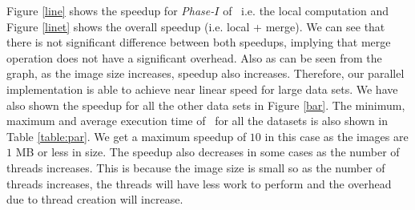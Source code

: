 Figure \ref{line} shows the speedup for {\em Phase-$I$} of \paremsp\ i.e. 
the local computation and Figure \ref{linet} shows the overall speedup (i.e.
local + merge). We can see that there is not significant difference between both speedups, implying that merge operation
does not have a significant overhead. 
Also as can be seen from the graph, as the image size increases, speedup also
increases. Therefore, our parallel implementation is able to achieve near linear
speed for large data sets. We have also shown the speedup for all the other data sets in Figure \ref{bar}.
The minimum, maximum and average execution time of \paremsp\ for all the datasets is also shown in Table \ref{table:par}.
We get a maximum speedup of $10$ in this case as the images are $1$ MB or less in size. The speedup also decreases in some cases as the
number of threads increases.
This is because the image size is small so as the number of threads increases,
the threads will have less work to perform and the overhead due to thread
creation will increase.


